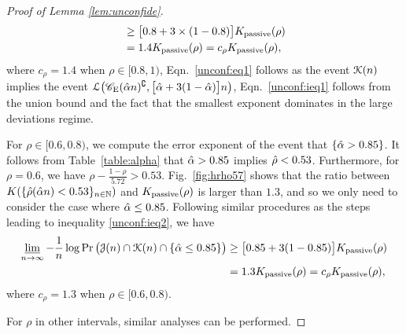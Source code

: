 \begin{proof}[Proof of Lemma \ref{lem:unconfide}]
\begin{align}
		&\geq \big[0.8+3\times(1-0.8)\big]K _{{\rm passive}}(\rho)\\*
		&=1.4K _{{\rm passive}}(\rho)= c_{\rho}K _{{\rm passive}}(\rho), \label{unconf:ieq2}
	\end{align}
	where $c_{\rho}=1.4$ when $\rho\in[0.8,1)$, Eqn.~\eqref{unconf:eq1} follows as the event $\mathcal{K}(n)$ implies the event $\mathcal{L}\big(\mathscr{C}_{\mathrm{E}}(\hat{\alpha} n)^{\complement},\big[\hat{\alpha}+3(1-\hat{\alpha})\big]n\big)$, Eqn.~\eqref{unconf:ieq1} follows  from the union bound and the fact that the smallest exponent dominates in the large deviations regime. 

	For $\rho\in [0.6,0.8)$, we compute the error exponent of the event that $\{\hat{\alpha} >0.85\}$. It follows from Table~\ref{table:alpha} that $\hat{\alpha} >0.85$ implies $\hat{\rho}<0.53$. Furthermore, for $\rho=0.6$, we have $\rho-\frac{1-\rho}{5.72}> 0.53$. Fig.~\ref{fig:hrho57} shows that the ratio between $K(\{\hat{\rho}(\hat{\alpha} n)<0.53\}_{n\in\mathbb{N}})$ and $K_{{\rm passive}}(\rho)$ is larger than $1.3$, and so we only need to consider the case where $\hat{\alpha} \leq 0.85$. Following similar procedures as the steps leading to inequality \eqref{unconf:ieq2}, we have
	\begin{align}
		\varliminf_{n\rightarrow\infty}-\frac{1}{n}\log\Pr\big(\mathcal{J}(n)\cap \mathcal{K}(n)\cap \{\hat{\alpha} \leq 0.85\}\big)
		&\geq \big[0.85+3(1-0.85)\big]K _{{\rm passive}}(\rho)\\*
		&=1.3K _{{\rm passive}}(\rho)=c_{\rho}K _{{\rm passive}}(\rho),
	\end{align}
	where $c_{\rho}=1.3$ when $\rho\in[0.6,0.8)$.

	For $\rho$ in other intervals,  similar analyses can be performed.
\end{proof}













